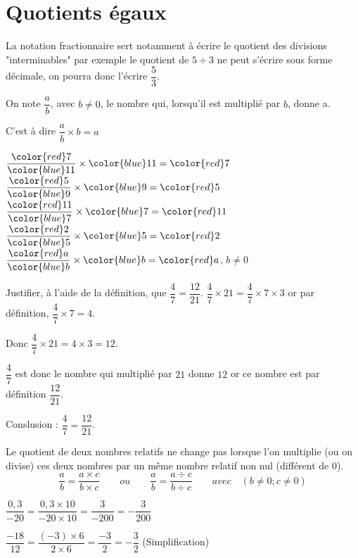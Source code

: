\section{Quotients égaux}
\begin{remarque}
    La notation fractionnaire sert notamment à écrire le quotient des divisions "interminables" par exemple le quotient de $5\div 3$
    ne peut s'écrire sous forme décimale, on pourra donc l'écrire $\dfrac{5}{3}$.
\end{remarque}

\begin{definition}
    On note $\dfrac{a}{b}$, avec $b\neq 0$, le nombre qui, lorsqu'il est multiplié par $b$, donne a.

    C'est à dire $\dfrac{a}{b} \times b=a$
\end{definition}

\begin{exemples*1}
    \phantom{rrr}

    \medskip
    $\dfrac{{\color{red}7}}{{\color{blue}11}} \times {\color{blue}11}={\color{red}7}$
    \hfill
    $\dfrac{{\color{red}5}}{{\color{blue}9}} \times {\color{blue}9}={\color{red}5}$
    \hfill
    $\dfrac{{\color{red}11}}{{\color{blue}7}} \times {\color{blue}7}={\color{red}11}$
    \hfill
    $\dfrac{{\color{red}2}}{{\color{blue}5}} \times {\color{blue}5}={\color{red}2}$
    \hfill
    $\dfrac{{\color{red}a}}{{\color{blue}b}} \times {\color{blue}b}={\color{red}a}$, $b\neq 0$
\end{exemples*1}

\begin{exemple*1}
    Justifier, à l'aide de la définition, que $\dfrac{4}{7}=\dfrac{12}{21}$.
    \correction
    $\dfrac{4}{7}\times 21=\dfrac{4}{7}\times 7\times 3$ or par définition, $\dfrac{4}{7}\times 7=4$.

    Donc $\dfrac{4}{7}\times 21=4\times 3 = 12$.

    $\dfrac{4}{7}$ est donc le nombre qui multiplié par $21$ donne $12$ or ce nombre est par définition $\dfrac{12}{21}$.

    Conslusion : $\dfrac{4}{7}=\dfrac{12}{21}$.
\end{exemple*1}

\begin{propriete}[\admise]
    Le quotient de deux nombres relatifs ne change pas lorsque l'on multiplie (ou on divise) ces deux nombres par un même nombre
    relatif non nul (différent de 0).
    $$\frac{a}{b}=\frac{a\times c}{b\times c}\qquad ou \qquad \frac{a}{b}=\frac{a\div
    c}{b\div c}\qquad avec \quad  (b\not=0; c\not=0)$$
\end{propriete}

\begin{exemples*1}
    \phantom{rrr}

    \medskip
    $\dfrac{0,3}{-20}=\dfrac{0,3\times10}{-20\times10}=\dfrac3{-200}=-\dfrac3{200}$

    \smallskip
    $\dfrac{-18}{12}=\dfrac{(-3)\times6}{2\times6}=\dfrac{-3}2=-\dfrac32$ (Simplification)
\end{exemples*1}
